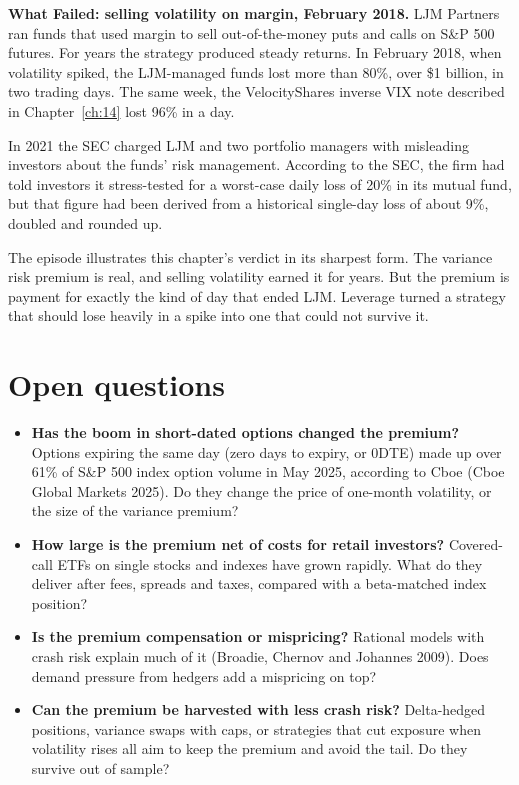 \begin{callout}
\textbf{What Failed: selling volatility on margin, February 2018.} LJM Partners ran funds that used margin to sell out-of-the-money puts and calls on S\&P 500 futures. For years the strategy produced steady returns. In February 2018, when volatility spiked, the LJM-managed funds lost more than 80\%, over \$1 billion, in two trading days. The same week, the VelocityShares inverse VIX note described in Chapter~\ref{ch:14} lost 96\% in a day.

In 2021 the SEC charged LJM and two portfolio managers with misleading investors about the funds' risk management. According to the SEC, the firm had told investors it stress-tested for a worst-case daily loss of 20\% in its mutual fund, but that figure had been derived from a historical single-day loss of about 9\%, doubled and rounded up.

The episode illustrates this chapter's verdict in its sharpest form. The variance risk premium is real, and selling volatility earned it for years. But the premium is payment for exactly the kind of day that ended LJM. Leverage turned a strategy that should lose heavily in a spike into one that could not survive it.
\end{callout}

\section{Open questions}
\label{sec:16-open}

\begin{itemize}
  \item \textbf{Has the boom in short-dated options changed the premium?} Options expiring the same day (zero days to expiry, or 0DTE) made up over 61\% of S\&P 500 index option volume in May 2025, according to Cboe (Cboe Global Markets 2025). Do they change the price of one-month volatility, or the size of the variance premium?
  \item \textbf{How large is the premium net of costs for retail investors?} Covered-call ETFs on single stocks and indexes have grown rapidly. What do they deliver after fees, spreads and taxes, compared with a beta-matched index position?
  \item \textbf{Is the premium compensation or mispricing?} Rational models with crash risk explain much of it (Broadie, Chernov and Johannes 2009). Does demand pressure from hedgers add a mispricing on top?
  \item \textbf{Can the premium be harvested with less crash risk?} Delta-hedged positions, variance swaps with caps, or strategies that cut exposure when volatility rises all aim to keep the premium and avoid the tail. Do they survive out of sample?
\end{itemize}

